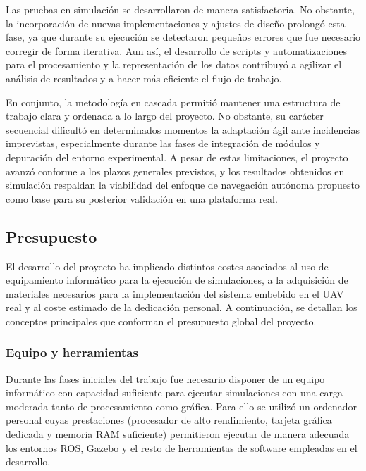 \vspace{0.4cm}
Las pruebas en simulación se desarrollaron de manera satisfactoria. No obstante, la incorporación de nuevas implementaciones y ajustes de diseño prolongó esta fase, ya que durante su ejecución se detectaron pequeños errores que fue necesario corregir de forma iterativa. Aun así, el desarrollo de scripts y automatizaciones para el procesamiento y la representación de los datos contribuyó a agilizar el análisis de resultados y a hacer más eficiente el flujo de trabajo.


\vspace{0.4cm}

En conjunto, la metodología en cascada permitió mantener una estructura de trabajo clara y ordenada a lo largo del proyecto. No obstante, su carácter secuencial dificultó en determinados momentos la adaptación ágil ante incidencias imprevistas, especialmente durante las fases de integración de módulos y depuración del entorno experimental. A pesar de estas limitaciones, el proyecto avanzó conforme a los plazos generales previstos, y los resultados obtenidos en simulación respaldan la viabilidad del enfoque de navegación autónoma propuesto como base para su posterior validación en una plataforma real.



\subsection{Presupuesto}

El desarrollo del proyecto ha implicado distintos costes asociados al uso de equipamiento informático para la ejecución de simulaciones, a la adquisición de materiales necesarios para la implementación del sistema embebido en el UAV real y al coste estimado de la dedicación personal. A continuación, se detallan los conceptos principales que conforman el presupuesto global del proyecto.

\subsubsection{Equipo y herramientas}

Durante las fases iniciales del trabajo fue necesario disponer de un equipo informático con capacidad suficiente para ejecutar simulaciones con una carga moderada tanto de procesamiento como gráfica. Para ello se utilizó un ordenador personal cuyas prestaciones (procesador de alto rendimiento, tarjeta gráfica dedicada y memoria RAM suficiente) permitieron ejecutar de manera adecuada los entornos ROS, Gazebo y el resto de herramientas de software empleadas en el desarrollo.

